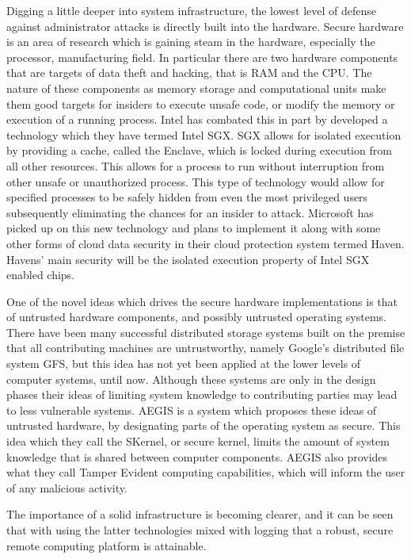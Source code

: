Digging a little deeper into system infrastructure, the lowest level of defense against administrator attacks is directly built into the hardware. Secure hardware is an area of research which is gaining steam in the hardware, especially the processor, manufacturing field. In particular there are two hardware components that are targets of data theft and hacking, that is RAM and the CPU. The nature of these components as memory storage and computational units make them good targets for insiders to execute unsafe code, or modify the memory or execution of a running process. Intel has combated this in part by developed a technology which they have termed Intel SGX.\cite{baumann} SGX allows for isolated execution by providing a cache, called the Enclave, which is locked during execution from all other resources. This allows for a process to run without interruption from other unsafe or unauthorized process. This type of technology would allow for specified processes to be safely hidden from even the most privileged users subsequently eliminating the chances for an insider to attack. Microsoft has picked up on this new technology and plans to implement it along with some other forms of cloud data security in their cloud protection system termed Haven. Havens' main security will be the isolated execution property of Intel SGX enabled chips.\cite{baumann}

One of the novel ideas which drives the secure hardware implementations is that of untrusted hardware components, and possibly untrusted operating systems.\cite{suh} There have been many successful distributed storage systems built on the premise that all contributing machines are untrustworthy, namely Google's distributed file system GFS, but this idea has not yet been applied at the lower levels of computer systems, until now. Although these systems are only in the design phases their ideas of limiting system knowledge to contributing parties may lead to less vulnerable systems. AEGIS is a system which proposes these ideas of untrusted hardware, by designating parts of the operating system as secure. This idea which they call the SKernel, or secure kernel, limits the amount of system knowledge that is shared between computer components.\cite{suh} AEGIS also provides what they call Tamper Evident computing capabilities, which will inform the user of any malicious activity.

The importance of a solid infrastructure is becoming clearer, and it can be seen that with using the latter technologies mixed with logging that a robust, secure remote computing platform is attainable.

